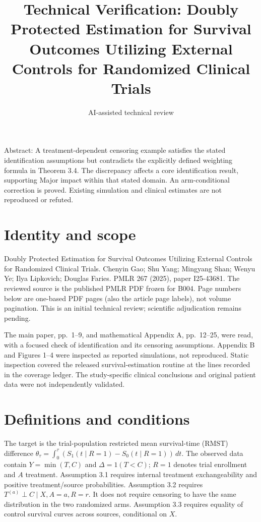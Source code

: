 \documentclass[10pt]{article}
\title{Technical Verification: Doubly Protected Estimation for Survival Outcomes Utilizing External Controls for Randomized Clinical Trials}
\author{AI-assisted technical review}
\date{}
\begin{document}
\maketitle
Abstract: A treatment-dependent censoring example satisfies the stated identification assumptions but contradicts the explicitly defined weighting formula in Theorem 3.4. The discrepancy affects a core identification result, supporting Major impact within that stated domain. An arm-conditional correction is proved. Existing simulation and clinical estimates are not reproduced or refuted.\par
\section*{Identity and scope}
Doubly Protected Estimation for Survival Outcomes Utilizing External Controls for Randomized Clinical Trials. Chenyin Gao; Shu Yang; Mingyang Shan; Wenyu Ye; Ilya Lipkovich; Douglas Faries. PMLR 267 (2025), paper I25-43681. The reviewed source is the published PMLR PDF frozen for B004. Page numbers below are one-based PDF pages (also the article page labels), not volume pagination. This is an initial technical review; scientific adjudication remains pending.\par
The main paper, pp. 1–9, and mathematical Appendix A, pp. 12–25, were read, with a focused check of identification and its censoring assumptions. Appendix B and Figures 1–4 were inspected as reported simulations, not reproduced. Static inspection covered the released survival-estimation routine at the lines recorded in the coverage ledger. The study-specific clinical conclusions and original patient data were not independently validated.\par
\section*{Definitions and conditions}
The target is the trial-population restricted mean survival-time (RMST) difference \(\theta_\tau=\int_0^\tau(S_1(t\mid R=1)-S_0(t\mid R=1))\,dt\). The observed data contain \(Y=\min(T,C)\) and \(\Delta=1(T<C)\); \(R=1\) denotes trial enrollment and \(A\) treatment. Assumption 3.1 requires internal treatment exchangeability and positive treatment/source probabilities. Assumption 3.2 requires \(T^{(a)}\perp C\mid X,A=a,R=r\). It does not require censoring to have the same distribution in the two randomized arms. Assumption 3.3 requires equality of control survival curves across sources, conditional on \(X\).\par
\end{document}
